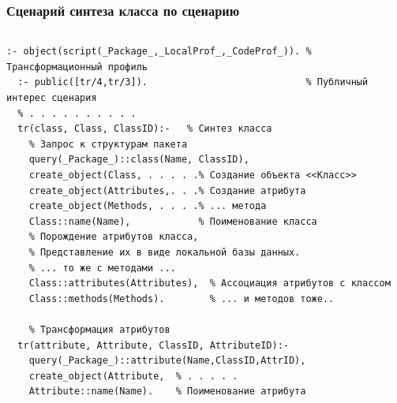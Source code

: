 \documentclass[10pt]{beamer}
\begin{document}
\begin{frame}[fragile]
  \frametitle{Сценарий синтеза класса по сценарию}

  \begin{columns}
    \begin{column}{0.6\textwidth}
\begin{verbatim}
:- object(script(_Package_,_LocalProf_,_CodeProf_)). % Трансформационный профиль
  :- public([tr/4,tr/3]).                            % Публичный интерес сценария
  % . . . . . . . . . .
  tr(class, Class, ClassID):-   % Синтез класса
    % Запрос к структурам пакета
    query(_Package_)::class(Name, ClassID),
    create_object(Class, . . . . .% Создание объекта <<Класс>>
    create_object(Attributes,. . .% Создание атрибута
    create_object(Methods, . . . .% ... метода
    Class::name(Name),            % Поименование класса
    % Порождение атрибутов класса,
    % Представление их в виде локальной базы данных.
    % ... то же с методами ...
    Class::attributes(Attributes),  % Ассоциация атрибутов с классом
    Class::methods(Methods).        % ... и методов тоже..

    % Трансформация атрибутов
  tr(attribute, Attribute, ClassID, AttributeID):-
    query(_Package_)::attribute(Name,ClassID,AttrID),
    create_object(Attribute,  % . . . . .
    Attribute::name(Name).    % Поименование атрибута


\end{verbatim}
\end{column}
\end{columns}
\end{frame}
\end{document}
